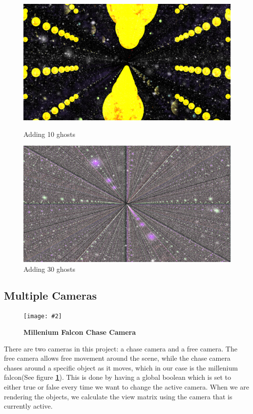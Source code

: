 \documentclass[10pt, a4paper]{article}
\newcommand{\figuremacro}[5]{
    \begin{figure}[#1]
        \centering
        \texttt{[image: \#2]}
        \caption[#3]{\textbf{#3}#4}
        \label{fig:#2}
    \end{figure}
}
\begin{document}
\begin{figure}[!tbp]
	\centering
	\begin{minipage}[b]{0.4\textwidth}
		\includegraphics[width=\textwidth]{LensShapes1}
		\caption{Adding 10 ghosts}
	\end{minipage}
	\hfill
	\begin{minipage}[b]{0.4\textwidth}
		\includegraphics[width=\textwidth]{LensShapes2}
		\caption{Adding 30 ghosts}
	\end{minipage}
\end{figure}
	\fi
\subsection{Multiple Cameras}	
	
		\figuremacro{H}{Project_Falcon}{Millenium Falcon Chase Camera}{ }{1.0}
	
	There are two cameras in this project: a chase camera and a free camera. The free camera allows free movement around the scene, while the chase camera chases around a specific object as it moves, which in our case is the millenium falcon(See figure \textbf{\ref{fig:Project_Falcon}}). This is done by having a global boolean which is set to either true or false every time we want to change the active camera. When we are rendering the objects, we calculate the view matrix using the camera that is currently active. 
	
\end{document}
